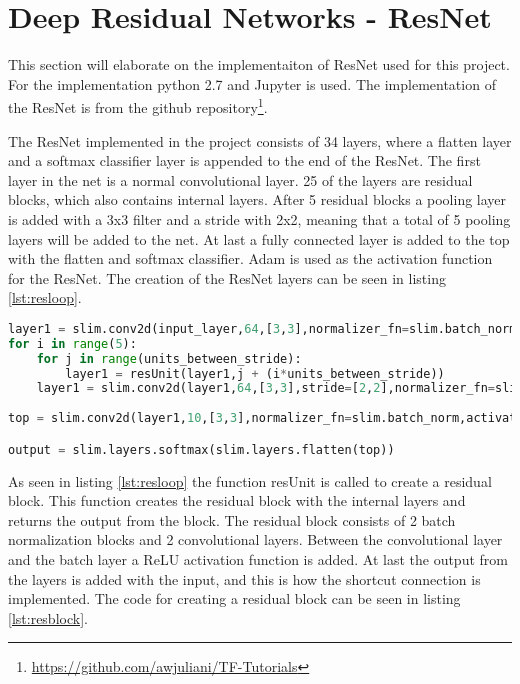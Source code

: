 \section{Deep Residual Networks - ResNet}

This section will elaborate on the implementaiton of ResNet used for this project. For the implementation python 2.7 and Jupyter is used. The implementation of the ResNet is from the github repository\footnote{\url{https://github.com/awjuliani/TF-Tutorials}}. 

The ResNet implemented in the project consists of 34 layers, where a flatten layer and a softmax classifier layer is appended to the end of the ResNet. The first layer in the net is a normal convolutional layer. 25 of the layers are residual blocks, which also contains internal layers. After 5 residual blocks a pooling layer is added with a 3x3 filter and a stride with 2x2, meaning that a total of 5 pooling layers will be added to the net. At last a fully connected layer is added to the top with the flatten and softmax classifier. Adam is used as the activation function for the ResNet. The creation of the ResNet layers can be seen in listing \ref{lst:resloop}.

\begin{lstlisting}[language=Python, label=lst:resloop, caption=For loop that creates the layers in the ResNet]
layer1 = slim.conv2d(input_layer,64,[3,3],normalizer_fn=slim.batch_norm,scope='conv_'+str(0))
for i in range(5):
    for j in range(units_between_stride):
        layer1 = resUnit(layer1,j + (i*units_between_stride))
    layer1 = slim.conv2d(layer1,64,[3,3],stride=[2,2],normalizer_fn=slim.batch_norm,scope='conv_s_'+str(i))
    
top = slim.conv2d(layer1,10,[3,3],normalizer_fn=slim.batch_norm,activation_fn=None,scope='conv_top')

output = slim.layers.softmax(slim.layers.flatten(top))
\end{lstlisting}

As seen in listing \ref{lst:resloop} the function resUnit is called to create a residual block. This function creates the residual block with the internal layers and returns the output from the block. The residual block consists of 2 batch normalization blocks and 2 convolutional layers. Between the convolutional layer and the batch layer a ReLU activation function is added. At last the output from the layers is added with the input, and this is how the shortcut connection is implemented. The code for creating a residual block can be seen in listing \ref{lst:resblock}.

